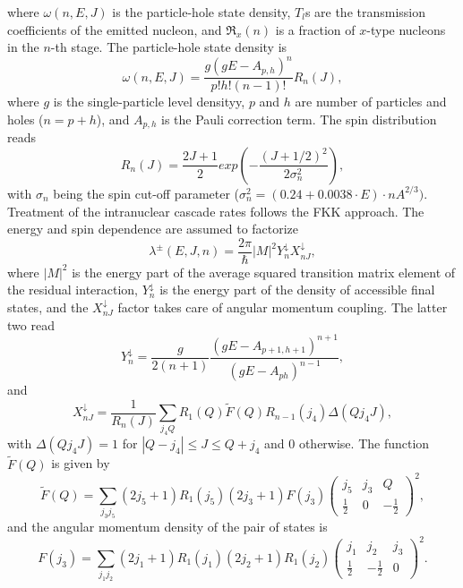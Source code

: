 \documentclass[twocolumn,amsmath,amssymb,10pt,groupedaddress,a4paper]{revtex4}
\begin{document}
\noindent where $\omega(n,E,J)$ is the particle-hole state density, $T_{l}$s
are the transmission coefficients of the emitted nucleon, and $\Re_{x}(n)$
is a fraction of $x$-type nucleons in the $n$-th stage. The particle-hole
state density is
\begin{equation}
\omega(n,E,J)=\frac{g(gE-A_{p,h})^{n}}{p!h!(n-1)!}R_{n}(J),
\end{equation}
\noindent where $g$ is the single-particle level densityy,
$p$ and $h$ are number of particles and holes ($n=p+h$), and $A_{p,h}$
is the Pauli correction term. The spin distribution reads
\begin{equation}
R_{n}(J)=\frac{2J+1}{2}exp\left(-\frac{(J+1/2)^{2}}{2\sigma_{n}^{2}}\right),
\end{equation}
 with $\sigma_{n}$ being the spin cut-off parameter ($\sigma_{n}^{2}=(0.24+0.0038\cdot E)\cdot nA^{2/3}).$
Treatment of the intranuclear cascade rates follows the FKK \cite{FKK}
approach. The energy and spin dependence are assumed to factorize
\begin{equation}
\lambda^{\pm}(E,J,n)=\frac{2\pi}{\hbar}|M|^{2}Y_{n}^{\downarrow}X_{nJ}^{\downarrow},
\end{equation}
\noindent where $|M|^{2}$ is the energy part of the average squared transition
matrix element of the residual interaction, $Y_{n}^{\downarrow}$
is the energy part of the density of accessible final states,  and
the $X_{nJ}^{\downarrow}$ factor takes care of angular momentum coupling.
The latter two read
\begin{equation}
Y_{n}^{\downarrow}=\frac{g}{2(n+1)}\frac{(gE-A_{p+1,h+1})^{n+1}}{(gE-A_{ph})^{n-1}},
\end{equation}
 and
\begin{equation}
X_{nJ}^{\downarrow}=\frac{1}{R_{n}(J)}\sum_{j_{4}Q}R_{1}(Q)\widetilde{F}(Q)R_{n-1}(j_{4})\Delta(Qj_{4}J),
\end{equation}
 with $\Delta(Qj_{4}J)=1$ for $|Q-j_{4}|\leq J\leq Q+j_{4}$ and
0 otherwise. The function $\widetilde{F}(Q)$ is given by
\begin{equation}
\widetilde{F}(Q)=\sum_{j_{3}j_{5}}(2j_{5}+1)R_{1}(j_{5})(2j_{3}+1)F(j_{3})\left(\begin{array}{ccc}
j_{5} & j_{3} & Q\\
\frac{1}{2} & 0 & -\frac{1}{2}\end{array}\right)^{2},
\end{equation}
 and the angular momentum density of the pair of states is
\begin{equation}
F(j_{3})=\sum_{j_{1}j_{2}}(2j_{1}+1)R_{1}(j_{1})(2j_{2}+1)R_{1}(j_{2})\left(\begin{array}{ccc}
j_{1} & j_{2} & j_{3}\\
\frac{1}{2} & -\frac{1}{2} & 0\end{array}\right)^{2}.
\end{equation}
\end{document}
